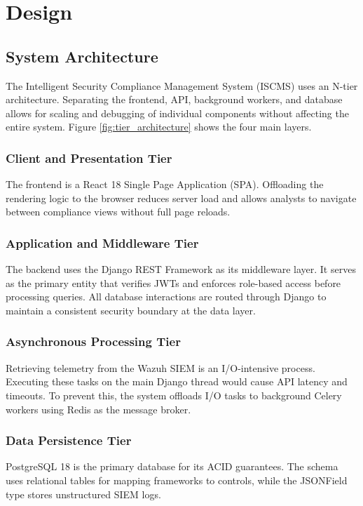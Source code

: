 \chapter{Design}

\section{System Architecture}
The Intelligent Security Compliance Management System (ISCMS) uses an N-tier architecture. Separating the frontend, API, background workers, and database allows for scaling and debugging of individual components without affecting the entire system. Figure \ref{fig:tier_architecture} shows the four main layers.

\subsection{Client and Presentation Tier}
The frontend is a React 18 Single Page Application (SPA). Offloading the rendering logic to the browser reduces server load and allows analysts to navigate between compliance views without full page reloads.

\subsection{Application and Middleware Tier}
The backend uses the Django REST Framework as its middleware layer. It serves as the primary entity that verifies JWTs and enforces role-based access before processing queries. All database interactions are routed through Django to maintain a consistent security boundary at the data layer.

\subsection{Asynchronous Processing Tier}
Retrieving telemetry from the Wazuh SIEM is an I/O-intensive process. Executing these tasks on the main Django thread would cause API latency and timeouts. To prevent this, the system offloads I/O tasks to background Celery workers using Redis as the message broker.

\subsection{Data Persistence Tier}
PostgreSQL 18 is the primary database for its ACID guarantees. The schema uses relational tables for mapping frameworks to controls, while the JSONField type stores unstructured SIEM logs.

